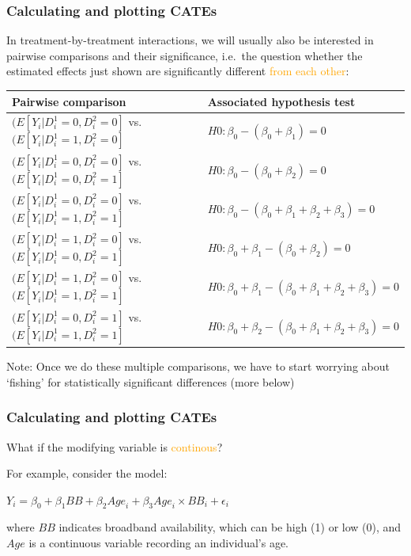 \documentclass[12pt,english,dvipsnames,aspectratio=169,handout]{beamer}\usepackage[]{graphicx}\usepackage[]{xcolor}
\begin{document}
\begin{frame}
  \frametitle{Calculating and plotting CATEs}
\footnotesize

In treatment-by-treatment interactions, we will usually also be interested in pairwise comparisons and their significance, i.e.\ the question whether the estimated effects just shown are significantly different \textcolor{orange}{from each other}:
\vspace{5mm}

\tiny
\centering
\begin{tabular}{ll}
Pairwise comparison & Associated hypothesis test \\
\midrule
$(E[Y_i|D_i^1=0, D_i^2=0]$ vs.\ $(E[Y_i|D_i^1=1, D_i^2=0]$ & $H0: \beta_0 - (\beta_0 + \beta_1) = 0$ \\
$(E[Y_i|D_i^1=0, D_i^2=0]$ vs.\ $(E[Y_i|D_i^1=0, D_i^2=1]$ & $H0: \beta_0 - (\beta_0 + \beta_2) = 0$ \\
$(E[Y_i|D_i^1=0, D_i^2=0]$ vs.\ $(E[Y_i|D_i^1=1, D_i^2=1]$ & $H0: \beta_0 - (\beta_0 + \beta_1 + \beta_2 + \beta_3) = 0$ \\
$(E[Y_i|D_i^1=1, D_i^2=0]$ vs.\ $(E[Y_i|D_i^1=0, D_i^2=1]$ & $H0: \beta_0 + \beta_1 - (\beta_0 + \beta_2) = 0$ \\
$(E[Y_i|D_i^1=1, D_i^2=0]$ vs.\ $(E[Y_i|D_i^1=1, D_i^2=1]$ & $H0: \beta_0 + \beta_1 - (\beta_0 + \beta_1 + \beta_2 + \beta_3) = 0$ \\
$(E[Y_i|D_i^1=0, D_i^2=1]$ vs.\ $(E[Y_i|D_i^1=1, D_i^2=1]$ & $H0: \beta_0 + \beta_2 - (\beta_0 + \beta_1 + \beta_2 + \beta_3) = 0$
\end{tabular}

\flushleft\footnotesize
Note: Once we do these multiple comparisons, we have to start worrying about `fishing' for statistically significant differences (more below)
\vspace{1cm}

\end{frame}




\begin{frame}
  \frametitle{Calculating and plotting CATEs}
\footnotesize

What if the modifying variable is \textcolor{orange}{continous}?

For example, consider the model: 

$Y_i = \beta_0 + \beta_1 {BB} + \beta_2 {Age}_i + \beta_3 {Age}_i \times {BB}_i + \epsilon_i$

where ${BB}$ indicates broadband availability, which can be high (1) or low (0), and ${Age}$ is a continuous variable recording an individual's age.

\vspace{3cm}

\end{frame}
\end{document}
